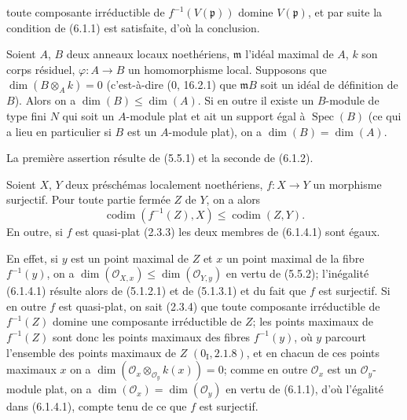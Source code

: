 
toute composante irréductible de $f^{-1}(V(\mathfrak p))$ domine
$V(\mathfrak p)$, et par suite la condition de (6.1.1) est satisfaite, d'où la
conclusion.

\begin{corollary}[6.1.3]
\label{IV.2.s6.1.3-fr}
Soient $A$, $B$ deux anneaux locaux noethériens, $\mathfrak m$ l'idéal maximal
de $A$, $k$ son corps résiduel, $\varphi:A\to B$ un homomorphisme local.
Supposons que $\dim(B\otimes_Ak)=0$ (c'est-à-dire (0, 16.2.1) que
$\mathfrak mB$ soit un idéal de définition de $B$). Alors on a
$\dim(B)\leq\dim(A)$. Si en outre il existe un $B$-module de type fini $N$ qui
soit un $A$-module plat et ait un support égal à $\operatorname{Spec}(B)$
(ce qui a lieu en particulier si $B$ est un $A$-module plat), on a
$\dim(B)=\dim(A)$.
\end{corollary}

La première assertion résulte de (5.5.1) et la seconde de (6.1.2).

\begin{corollary}[6.1.4]
\label{IV.2.s6.1.4-fr}
Soient $X$, $Y$ deux préschémas localement noethériens, $f:X\to Y$ un
morphisme surjectif. Pour toute partie fermée $Z$ de $Y$, on a alors
\begin{equation}
\operatorname{codim}(f^{-1}(Z),X)\leq\operatorname{codim}(Z,Y).
\tag{6.1.4.1}\label{IV.2.s6.1.4.1-fr}
\end{equation}
En outre, si $f$ est quasi-plat (2.3.3) les deux membres de (6.1.4.1) sont
égaux.
\end{corollary}

En effet, si $y$ est un point maximal de $Z$ et $x$ un point maximal de la
fibre $f^{-1}(y)$, on a
$\dim(\mathcal O_{X,x})\leq\dim(\mathcal O_{Y,y})$ en vertu de (5.5.2);
l'inégalité (6.1.4.1) résulte alors de (5.1.2.1) et de (5.1.3.1) et du fait
que $f$ est surjectif. Si en outre $f$ est quasi-plat, on sait (2.3.4) que
toute composante irréductible de $f^{-1}(Z)$ domine une composante
irréductible de $Z$; les points maximaux de $f^{-1}(Z)$ sont donc les points
maximaux des fibres $f^{-1}(y)$, où $y$ parcourt l'ensemble des points maximaux
de $Z$ $(0_{\mathrm I}, 2.1.8)$, et en chacun de ces points maximaux $x$ on a
$\dim(\mathcal O_x\otimes_{\mathcal O_y}k(x))=0$; comme en outre
$\mathcal O_x$ est un $\mathcal O_y$-module plat, on a
$\dim(\mathcal O_x)=\dim(\mathcal O_y)$ en vertu de (6.1.1), d'où l'égalité
dans (6.1.4.1), compte tenu de ce que $f$ est surjectif.


